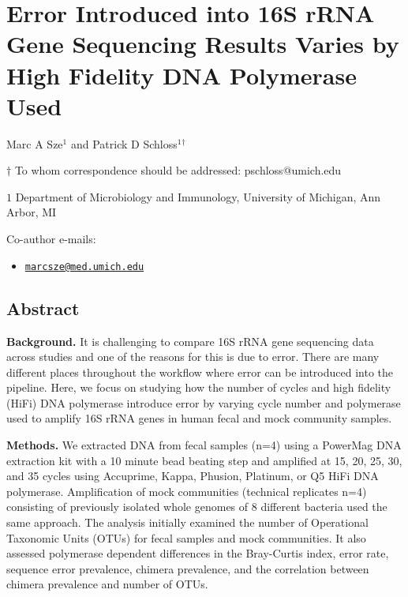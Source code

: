 \documentclass[11pt,]{article}
\title{}
\author{}
\date{}
\providecommand{\tightlist}{%
  \setlength{\itemsep}{0pt}\setlength{\parskip}{0pt}}
\begin{document}
\section{Error Introduced into 16S rRNA Gene Sequencing Results Varies
by High Fidelity DNA Polymerase
Used}\label{error-introduced-into-16s-rrna-gene-sequencing-results-varies-by-high-fidelity-dna-polymerase-used}

\begin{center}
\vspace{25mm}

Marc A Sze${^1}$ and Patrick D Schloss${^1}$${^\dagger}$

\vspace{20mm}

$\dagger$ To whom correspondence should be addressed: pschloss@umich.edu

$1$ Department of Microbiology and Immunology, University of Michigan, Ann Arbor, MI




\end{center}

Co-author e-mails:

\begin{itemize}
\tightlist
\item
  \href{mailto:marcsze@med.umich.edu}{\nolinkurl{marcsze@med.umich.edu}}
\end{itemize}

\newpage

\linenumbers

\subsection{Abstract}\label{abstract}

\textbf{Background.} It is challenging to compare 16S rRNA gene
sequencing data across studies and one of the reasons for this is due to
error. There are many different places throughout the workflow where
error can be introduced into the pipeline. Here, we focus on studying
how the number of cycles and high fidelity (HiFi) DNA polymerase
introduce error by varying cycle number and polymerase used to amplify
16S rRNA genes in human fecal and mock community samples.

\textbf{Methods.} We extracted DNA from fecal samples (n=4) using a
PowerMag DNA extraction kit with a 10 minute bead beating step and
amplified at 15, 20, 25, 30, and 35 cycles using Accuprime, Kappa,
Phusion, Platinum, or Q5 HiFi DNA polymerase. Amplification of mock
communities (technical replicates n=4) consisting of previously isolated
whole genomes of 8 different bacteria used the same approach. The
analysis initially examined the number of Operational Taxonomic Units
(OTUs) for fecal samples and mock communities. It also assessed
polymerase dependent differences in the Bray-Curtis index, error rate,
sequence error prevalence, chimera prevalence, and the correlation
between chimera prevalence and number of OTUs.
\end{document}
